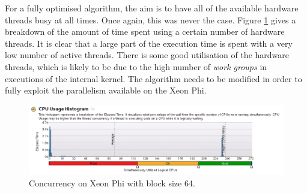 \par{For a fully optimised algorithm, the aim is to have all of 
    the available hardware threads busy at all times. Once again, 
    this was never the case. Figure \ref{Concurrency_64_Phi} gives a breakdown 
    of the amount of time spent using a certain number of hardware threads. 
    It is clear that a large part of the execution time is spent with a 
    very low number of active threads. There is some good utilisation 
    of the hardware threads, which is likely to be due to the high number 
    of \emph{work groups} in executions of the internal kernel. The algorithm 
    needs to be modified in order to fully exploit the parallelism 
    available on the Xeon Phi.}

\begin{figure}[!h]
    \centering
    \includegraphics[width=1.0\textwidth]{figures/Concurrency_64_Phi.png}
    \caption{Concurrency on Xeon Phi with block size 64.}
    \label{Concurrency_64_Phi}
\end{figure}

